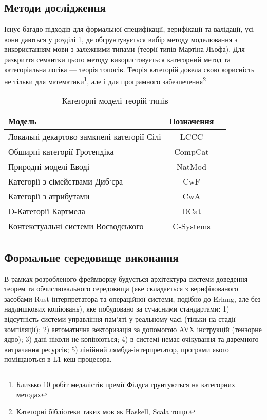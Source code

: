 \newpage
\subsection{Методи дослідження}
Існує багадо підходів для формальної специфікації,
верифікації та валідації, усі вони даються у розділі 1, де
обгрунтувується вибір методу моделювання з використанням
мови з залежними типами (теорії типів Мартіна-Льофа).
Для разкриття семантки цього методу використовується
категорний метод та категоріальна логіка --- теорія топосів.
Теорія категорій довела свою корисність не тільки для
математики\footnote{Близько 10 робіт медалістів премії
Філдса грунтуються на категорних методах},
але і для програмного
забезпечення\footnote{Категорні бібліотеки таких мов як Haskell, Scala тощо.}

\begin{table}[ht]
 \caption{Категорні моделі теорій типів}
  \begin{tabular}{lcc}
    \hline
 \textbf{Модель} & \textbf{Позначення} & \\
    \hline
 Локальні декартово-замкнені категорії Сілі & LCCC & \\
 Обширні категорії Гротендіка               & CompCat & \\
 Природні моделі Еводі                      & NatMod & \\
 Категорії з сімействами Диб`єра            & CwF & \\
 Категорії з атрибутами                     & CwA & \\
 D-Категорії Картмела                       & DCat & \\
 Контекстуальні системи Воєводського        & C-Systems & \\
    \hline
  \end{tabular}
\end{table}

\subsection{Формальне середовище виконання}
В рамках розробленого фреймворку будується
архітектура системи доведення теорем та обчислювального
середовища (яке складається з верифікованого засобами Rust
інтерпретатора та операційної системи, подібно до Erlang, але без надлишкових копіювань),
яке побудовано за сучасними стандартами:
1) відсутність системи управління пам'яті у реальному часі (тільки на стадії компіляції);
2) автоматична векторизація за допомогою AVX інструкцій (тензорне ядро);
3) дані ніколи не копіюються;
4) в системі немає очікування та даремного витрачання ресурсів;
5) лінійний лямбда-інтерпретатор, програми якого поміщаються в L1 кеш процесора.


